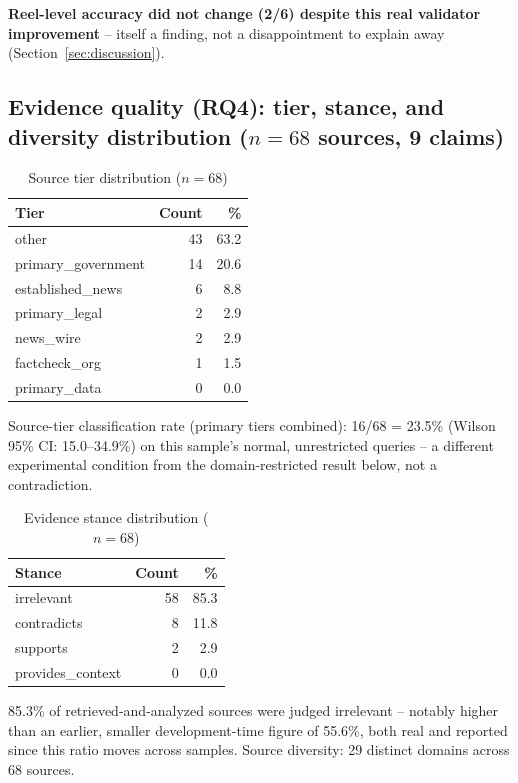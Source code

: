\documentclass[conference]{IEEEtran}
\begin{document}
\textbf{Reel-level accuracy did not change (2/6) despite this real
validator improvement} -- itself a finding, not a disappointment to
explain away (Section~\ref{sec:discussion}).

\subsection{Evidence quality (RQ4): tier, stance, and diversity distribution ($n=68$ sources, 9 claims)}
\begin{table}[!t]
\caption{Source tier distribution ($n=68$)}
\label{tab:tiers}
\centering
\footnotesize
\begin{tabular}{lrr}
\toprule
Tier & Count & \% \\
\midrule
other & 43 & 63.2 \\
primary\_government & 14 & 20.6 \\
established\_news & 6 & 8.8 \\
primary\_legal & 2 & 2.9 \\
news\_wire & 2 & 2.9 \\
factcheck\_org & 1 & 1.5 \\
primary\_data & 0 & 0.0 \\
\bottomrule
\end{tabular}
\end{table}

Source-tier classification rate (primary tiers combined): 16/68 = 23.5\%
(Wilson 95\% CI: 15.0--34.9\%) on this sample's normal, unrestricted
queries -- a different experimental condition from the domain-restricted
result below, not a contradiction.

\begin{table}[!t]
\caption{Evidence stance distribution ($n=68$)}
\label{tab:stance}
\centering
\footnotesize
\begin{tabular}{lrr}
\toprule
Stance & Count & \% \\
\midrule
irrelevant & 58 & 85.3 \\
contradicts & 8 & 11.8 \\
supports & 2 & 2.9 \\
provides\_context & 0 & 0.0 \\
\bottomrule
\end{tabular}
\end{table}

85.3\% of retrieved-and-analyzed sources were judged irrelevant --
notably higher than an earlier, smaller development-time figure of
55.6\%, both real and reported since this ratio moves across samples.
Source diversity: 29 distinct domains across 68 sources.
\end{document}

